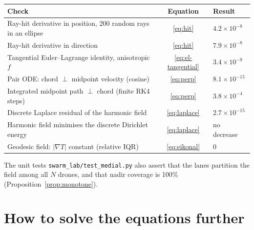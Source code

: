 \documentclass[11pt,a4paper]{article}
\numberwithin{equation}{section}
\theoremstyle{plain}
\theoremstyle{definition}
\theoremstyle{remark}
\begin{document}
\begin{table}[ht]
\centering
\begin{tabular}{p{8.8cm}cl}
\toprule
Check & Equation & Result \\
\midrule
Ray-hit derivative in position, 200 random rays in an ellipse & \eqref{eq:hit} & $4.2\times10^{-8}$ \\
Ray-hit derivative in direction & \eqref{eq:hit} & $7.9\times10^{-8}$ \\
Tangential Euler--Lagrange identity, anisotropic $f$ & \eqref{eq:el-tangential} & $3.4\times10^{-9}$ \\
Pair ODE: chord $\perp$ midpoint velocity (cosine) & \eqref{eq:perp} & $8.1\times10^{-15}$ \\
Integrated midpoint path $\perp$ chord (finite RK4 steps) & \eqref{eq:perp} & $3.8\times10^{-4}$ \\
Discrete Laplace residual of the harmonic field & \eqref{eq:laplace} & $2.7\times10^{-15}$ \\
Harmonic field minimises the discrete Dirichlet energy & \eqref{eq:laplace} & no decrease \\
Geodesic field: $|\nabla T|$ constant (relative IQR) & \eqref{eq:eikonal} & $0$ \\
\bottomrule
\end{tabular}
\end{table}

The unit tests \texttt{swarm\_lab/test\_medial.py} also assert that the lanes partition the field among all $N$ drones, and that nadir coverage is 100\% (Proposition~\ref{prop:monotone}).

\section{How to solve the equations further}
\end{document}
